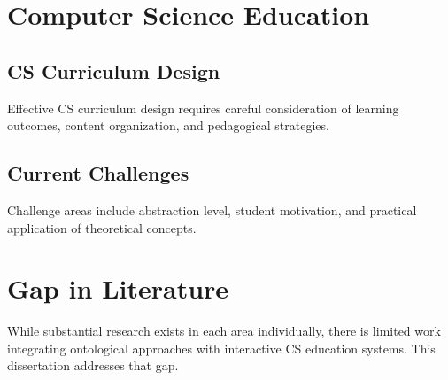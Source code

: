 \section{Computer Science Education}

\subsection{CS Curriculum Design}

Effective CS curriculum design requires careful consideration of learning outcomes, content organization, and pedagogical strategies.

\subsection{Current Challenges}

Challenge areas include abstraction level, student motivation, and practical application of theoretical concepts.

\section{Gap in Literature}

While substantial research exists in each area individually, there is limited work integrating ontological approaches with interactive CS education systems. This dissertation addresses that gap.
